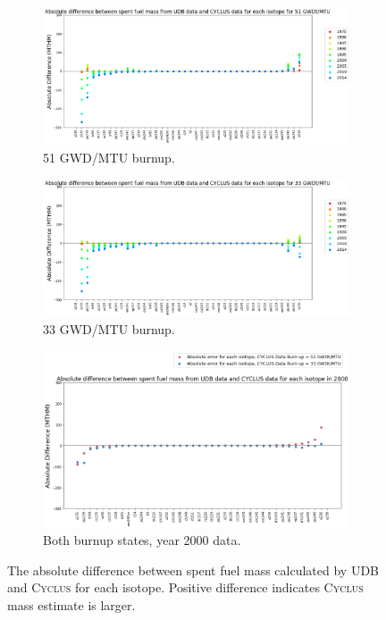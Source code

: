 \documentclass{anstrans}
\newcommand{\Cyclus}{\textsc{Cyclus}\xspace}%
\begin{document}
\begin{figure}[htb] %
	\centering
        \begin{subfigure}{0.9\textwidth}
        \includegraphics[height=0.30\textheight]{figures/absolute_diff_all_51}
        \caption{51 GWD/MTU burnup.}
	\label{fig:absolute_diff_all_51}
        \end{subfigure}
        \begin{subfigure}{0.9\textwidth}
        \includegraphics[height=0.30\textheight]{figures/absolute_diff_all_33}
        \caption{33 GWD/MTU burnup.}
	\label{fig:absolute_diff_all_33}
        \end{subfigure}
        \begin{subfigure}{0.9\textwidth}
        \includegraphics[height=0.35\textheight]{figures/absolute_diff_2000}
        \caption{Both burnup states, year 2000 data.}
	\label{fig:absolute_diff_2000}
        \end{subfigure}
        \caption{The absolute difference between spent fuel mass calculated by 
        \gls{UDB} and \Cyclus for each isotope. Positive difference indicates \Cyclus 
        mass estimate is larger.}
        \label{fig:absolute}
\end{figure} 
\FloatBarrier
\end{document}
